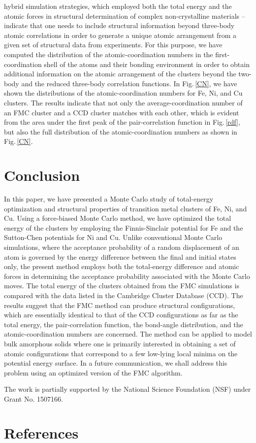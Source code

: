 \documentclass[a4paper]{jpconf}
\begin{document}
hybrid simulation strategies, which employed both the total energy and 
the atomic forces in structural determination of 
complex non-crystalline materials -- indicate that 
one needs to include structural information beyond three-body atomic 
correlations in order to generate a unique atomic arrangement from 
a given set of structural data from experiments. For this purpose, we have computed 
the distribution of the atomic-coordination numbers in 
the first-coordination shell of the atoms and their bonding environment 
in order to obtain additional information on the atomic arrangement of the 
clusters beyond the two-body and the reduced three-body 
correlation functions.  
In Fig.\,\ref{CN}, we have shown the distributions of 
the atomic-coordination numbers for Fe, Ni, and 
Cu clusters.  The results indicate that not only 
the average-coordination number of an FMC cluster and a CCD 
cluster matches with each other, which is evident from the area 
under the first peak of the pair-correlation function 
in Fig.\,\ref{rdf}, but also the full distribution of 
the atomic-coordination numbers as shown in Fig.\,\ref{CN}. 

\section{Conclusion}
In this paper, we have presented a Monte Carlo study of 
total-energy optimization and structural properties of 
transition metal clusters of Fe, Ni, and Cu.  Using a 
force-biased Monte Carlo method, we have optimized the 
total energy of the clusters by employing the 
Finnis-Sinclair potential for Fe and the Sutton-Chen 
potentials for Ni and Cu. 
Unlike conventional Monte Carlo simulations, where the 
acceptance probability of a random displacement of an 
atom is governed by the energy difference between the 
final and initial states only, the present method employs both 
the total-energy difference and atomic forces in determining the 
acceptance probability associated with the Monte Carlo moves. 
The total energy of the clusters obtained from 
the FMC simulations is compared with the data listed in 
the Cambridge Cluster Database (CCD). The results suggest 
that the FMC method can produce structural configurations, which are 
essentially identical to that of the CCD configurations as far 
as the total energy, the pair-correlation function, the 
bond-angle distribution, and the atomic-coordination numbers 
are concerned. The method can be applied to model bulk amorphous solids 
where one is primarily interested in obtaining a set of 
atomic configurations that correspond to a few low-lying 
local minima on the potential energy surface. In a future communication, we shall address 
this problem using an optimized version of the FMC algorithm. 

\ack
The work is partially supported by the National Science 
Foundation (NSF) under Grant No. 1507166. 

\section*{References}

\end{document}
